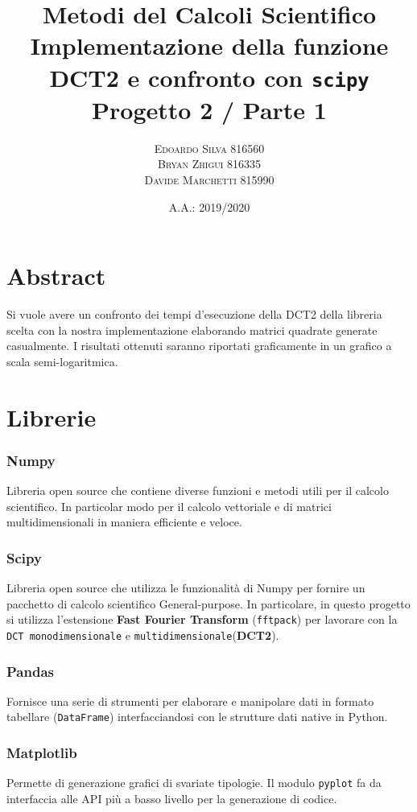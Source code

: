 \documentclass[11pt,italian]{article}
\title{
    Metodi del Calcoli Scientifico \\
    \normalsize Implementazione della funzione DCT2 e confronto con \lstinline{scipy} \\
	\normalsize Progetto 2 / Parte 1
}
\date{A.A.: 2019/2020}
\author{
	\normalsize
	\textsc{Edoardo Silva 816560} \\
	\normalsize
	\textsc{Bryan Zhigui 816335} \\
	\normalsize
	\textsc{Davide Marchetti 815990}
}
\begin{document}
\maketitle

\section*{Abstract}
Si vuole avere un confronto dei tempi d’esecuzione della DCT2 della libreria scelta con la nostra implementazione elaborando matrici quadrate generate casualmente.
I risultati ottenuti saranno riportati graficamente in un grafico a scala semi-logaritmica.

\newpage
\section{Librerie}
\subsubsection*{Numpy}
Libreria open source che contiene diverse funzioni e metodi utili per il calcolo scientifico. In particolar modo per il calcolo vettoriale e di matrici multidimensionali in maniera efficiente e veloce.

\subsubsection*{Scipy}
Libreria open source che utilizza le funzionalità di Numpy per fornire un pacchetto di calcolo scientifico General-purpose. In particolare, in questo progetto si utilizza l'estensione \textbf{Fast Fourier Transform} (\lstinline{fftpack}) per lavorare con la \lstinline{DCT monodimensionale} e \lstinline{multidimensionale}(\textbf{DCT2}).

\subsubsection*{Pandas}
Fornisce una serie di strumenti per elaborare e manipolare dati in formato tabellare (\lstinline{DataFrame}) interfacciandosi con le strutture dati native in Python.

\subsubsection*{Matplotlib}
Permette di generazione grafici di svariate tipologie.
Il modulo \lstinline{pyplot} fa da interfaccia alle API più a basso livello per la generazione di codice.
\end{document}

